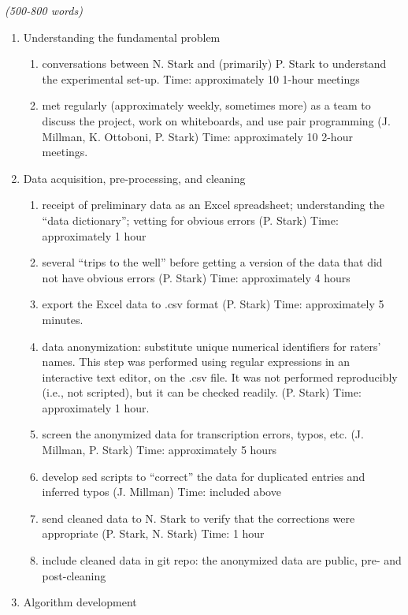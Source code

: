 \documentclass[]{article}
\begin{document}
\emph{(500-800 words)}

\begin{enumerate}
\def\labelenumi{\arabic{enumi}.}
\itemsep1pt\parskip0pt
\item
  Understanding the fundamental problem

  \begin{enumerate}
  \def\labelenumii{\roman{enumii}.}
  \itemsep1pt\parskip0pt
  \item
    conversations between N. Stark and (primarily) P. Stark to
    understand the experimental set-up. Time: approximately 10 1-hour
    meetings
  \item
    met regularly (approximately weekly, sometimes more) as a team to
    discuss the project, work on whiteboards, and use pair programming
    (J. Millman, K. Ottoboni, P. Stark) Time: approximately 10 2-hour
    meetings.
  \end{enumerate}
\item
  Data acquisition, pre-processing, and cleaning

  \begin{enumerate}
  \def\labelenumii{\roman{enumii}.}
  \itemsep1pt\parskip0pt
  \item
    receipt of preliminary data as an Excel spreadsheet; understanding
    the ``data dictionary''; vetting for obvious errors (P. Stark) Time:
    approximately 1 hour
  \item
    several ``trips to the well'' before getting a version of the data
    that did not have obvious errors (P. Stark) Time: approximately 4
    hours
  \item
    export the Excel data to .csv format (P. Stark) Time: approximately
    5 minutes.
  \item
    data anonymization: substitute unique numerical identifiers for
    raters' names. This step was performed using regular expressions in
    an interactive text editor, on the .csv file. It was not performed
    reproducibly (i.e., not scripted), but it can be checked readily.
    (P. Stark) Time: approximately 1 hour.
  \item
    screen the anonymized data for transcription errors, typos, etc. (J.
    Millman, P. Stark) Time: approximately 5 hours
  \item
    develop sed scripts to ``correct'' the data for duplicated entries
    and inferred typos (J. Millman) Time: included above
  \item
    send cleaned data to N. Stark to verify that the corrections were
    appropriate (P. Stark, N. Stark) Time: 1 hour
  \item
    include cleaned data in git repo: the anonymized data are public,
    pre- and post-cleaning
  \end{enumerate}
\item
  Algorithm development


\end{enumerate}
\end{document}
